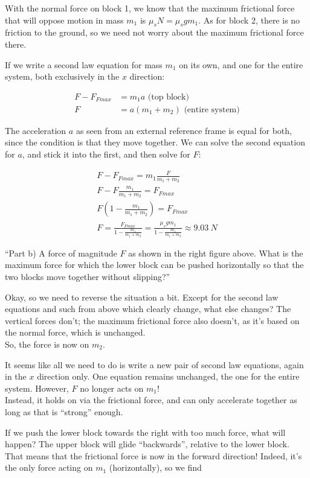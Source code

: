 \documentclass[12pt,a4paper]{report}
\begin{document}
With the normal force on block 1, we know that the maximum frictional force that will oppose motion in mass $m_1$ is $\mu_s N = \mu_s g m_1$. As for block 2, there is no friction to the ground, so we need not worry about the maximum frictional force there.

If we write a second law equation for mass $m_1$ on its own, and one for the entire system, both exclusively in the $x$ direction:

\begin{align}
F - F_{Fmax} &= m_1 a \text{ (top block)}\\
F &= a(m_1 + m_2) \text{ (entire system)}
\end{align}

The acceleration $a$ as seen from an external reference frame is equal for both, since the condition is that they move together. We can solve the second equation for $a$, and stick it into the first, and then solve for $F$:

\begin{align}
F - F_{Fmax} = m_1 \frac{F}{m_1 + m_2}\\
F - F \frac{m_1}{m_1 + m_2} = F_{Fmax}\\
F\left(1 - \frac{m_1}{m_1 + m_2}\right) = F_{Fmax}\\
F = \frac{F_{Fmax}}{1 - \frac{m_1}{m_1 + m_2}} = \frac{\mu_s g m_1}{1 - \frac{m_1}{m_1 + m_2}} \approx \SI{9.03}{N}
\end{align}

``Part b) A force of magnitude $F$ as shown in the right figure above. What is the maximum force for which the lower block can be pushed horizontally so that the two blocks move together without slipping?''

Okay, so we need to reverse the situation a bit. Except for the second law equations and such from above which clearly change, what else changes? The vertical forces don't; the maximum frictional force also doesn't, as it's based on the normal force, which is unchanged.\\
So, the force is now on $m_2$.

It seems like all we need to do is write a new pair of second law equations, again in the $x$ direction only. One equation remains unchanged, the one for the entire system. However, $F$ no longer acts on $m_1$!\\
Instead, it holds on via the frictional force, and can only accelerate together as long as that is ``strong'' enough.

If we push the lower block towards the right with too much force, what will happen? The upper block will glide ``backwards'', relative to the lower block. That means that the frictional force is now in the forward direction! Indeed, it's the only force acting on $m_1$ (horizontally), so we find
\end{document}

